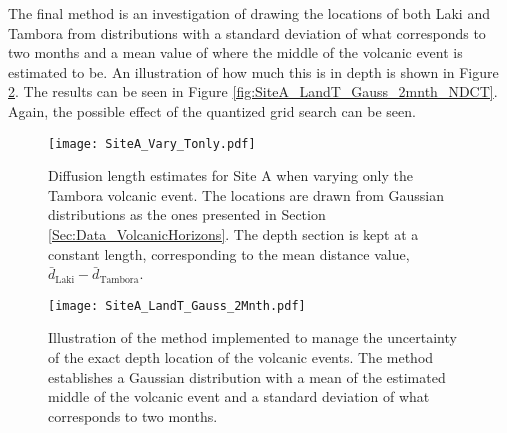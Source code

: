 \documentclass[../../CompleteThesis2/Complete_2ndDraft]{subfiles}
\begin{document}
The final method is an investigation of drawing the locations of both Laki and Tambora from distributions with a standard deviation of what corresponds to two months and a mean value of where the middle of the volcanic event is estimated to be. An illustration of how much this is in depth is shown in Figure \ref{fig:SiteA_LandT_Gauss_2Mnth}. The results can be seen in Figure \ref{fig:SiteA_LandT_Gauss_2mnth_NDCT}. Again, the possible effect of the quantized grid search can be seen.


\begin{figure}[!h]
	\centering
	\texttt{[image: SiteA\_Vary\_Tonly.pdf]}
	\caption[$\sigma$ variations, varying only Tambora]{\small Diffusion length estimates for Site A when varying only the Tambora volcanic event. The locations are drawn from Gaussian distributions as the ones presented in Section \ref{Sec:Data_VolcanicHorizons}. The depth section is kept at a constant length, corresponding to the mean distance value, $\bar{d}_{\text{Laki}}-\bar{d}_{\text{Tambora}}$.}
	\label{fig:SiteA_Vary_Lonly}
\end{figure}




\begin{figure}[!h]
	\centering
	\texttt{[image: SiteA\_LandT\_Gauss\_2Mnth.pdf]}
	\caption[2 month st. dev. variation of volcanic events locations]{\small Illustration of the method implemented to manage the uncertainty of the exact depth location of the volcanic events. The method establishes a Gaussian distribution with a mean of the estimated middle of the volcanic event and a standard deviation of what corresponds to two months.}
	\label{fig:SiteA_LandT_Gauss_2Mnth}
\end{figure}

\end{document}
